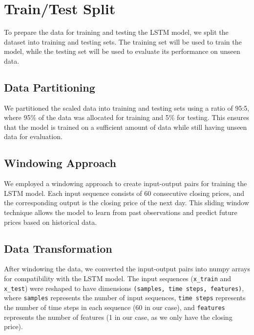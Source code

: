 \documentclass[10pt,twocolumn,letterpaper]{article}
\begin{document}
\section{Train/Test Split}
\label{sec:train-test-split}
To prepare the data for training and testing the LSTM model, we split the 
dataset into training and testing sets. The training set will be used to train 
the model, while the testing set will be used to evaluate its performance 
on unseen data.

\subsection{Data Partitioning}
We partitioned the scaled data into training and testing sets using a ratio 
of 95:5, where 95\% of the data was allocated for training and 5\% for testing. 
This ensures that the model is trained on a sufficient amount of data while still 
having unseen data for evaluation.

\subsection{Windowing Approach}
We employed a windowing approach to create input-output pairs for training 
the LSTM model. Each input sequence consists of 60 consecutive closing prices, 
and the corresponding output is the closing price of the next day. This sliding 
window technique allows the model to learn from past observations and 
predict future prices based on historical data.

\subsection{Data Transformation}
After windowing the data, we converted the input-output pairs into numpy 
arrays for compatibility with the LSTM model. The input sequences (\texttt{x\_train} 
and \texttt{x\_test}) were reshaped to have dimensions \texttt{(samples, time steps, features)}, 
where \texttt{samples} represents the number of input sequences, \texttt{time steps} 
represents the number of time steps in each sequence (60 in our case), and \texttt{features} 
represents the number of features (1 in our case, as we only have the closing price).
\end{document}
